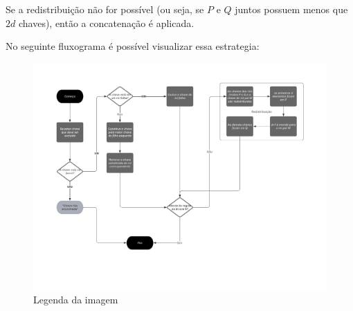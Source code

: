 Se a redistribuição não for possível (ou seja, se \( P \) e \( Q \) juntos possuem menos que \( 2d \) chaves), então a concatenação é aplicada.

No seguinte fluxograma é possível visualizar essa estrategia:

\begin{figure}[h]
    \centering
    \includegraphics[width=1.2\textwidth]{imagens/_fluxograma.png}
    \caption{Legenda da imagem}
    \label{fig:exemplo}
\end{figure}
